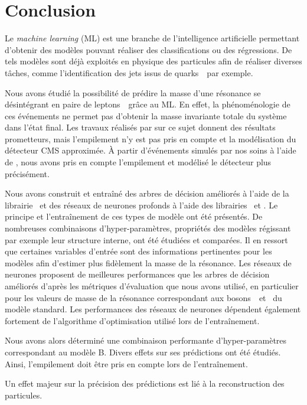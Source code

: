 \section{Conclusion}\label{chapter-ML-section-conclusion}
Le \emph{machine learning} (ML) est une branche de l'intelligence artificielle
permettant d'obtenir des modèles pouvant réaliser des classifications ou des régressions.
De tels modèles sont déjà exploités en physique des particules afin de réaliser diverses tâches,
comme l'identification des jets issus de quarks~\quarkb\ par exemple.
\par
Nous avons étudié la possibilité de prédire la masse d'une résonance se désintégrant en paire de leptons~\tau\ grâce au ML.
En effet, la phénoménologie de ces événements ne permet pas d'obtenir la masse invariante totale du système dans l'état final.
Les travaux réalisés par \citeauthor{BARTSCHI201929} sur ce sujet donnent des résultats prometteurs,
mais l'empilement n'y est pas pris en compte et la modélisation du détecteur CMS approximée.
À partir d'événements simulés par nos soins à l'aide de \FASTSIM,
nous avons pris en compte l'empilement et modélisé le détecteur plus précisément.
\par
Nous avons construit et entraîné
des arbres de décision améliorés
à l'aide de la librairie \XGBOOST\
et
des réseaux de neurones profonds
à l'aide des librairies \KERAS\ et \TENSORFLOW.
Le principe et l'entraînement de ces types de modèle ont été présentés.
De nombreuses combinaisons d'hyper-paramètres,
propriétés des modèles régissant par exemple leur structure interne,
ont été étudiées et comparées.
Il en ressort que certaines variables d'entrée sont des informations pertinentes pour les modèles
afin d'estimer plus fidèlement la masse de la résonance.
Les réseaux de neurones
proposent de meilleures performances que
les arbres de décision améliorés
d'après les métriques d'évaluation que nous avons utilisé,
en particulier pour les valeurs de masse de la résonance correspondant aux bosons~\Zboson\ et \higgs\ du modèle standard.
Les performances des réseaux de neurones dépendent également fortement de l'algorithme d'optimisation utilisé lors de l'entraînement.
\par
Nous avons alors déterminé une combinaison performante d'hyper-paramètres correspondant au modèle B.
Divers effets sur ses prédictions ont été étudiés.
Ainsi, l'empilement doit être pris en compte lors de l'entraînement.
\par
Un effet majeur sur la précision des prédictions est lié à la reconstruction des particules.
